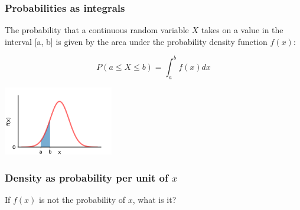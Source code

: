 \documentclass[9pt]{beamer}
\begin{document}
\begin{frame}
\frametitle{Probabilities as integrals}

The probability that a continuous random variable $X$ takes on a value in the interval [a, b] is given by the area under the probability density function $f(x)$:

\vspace{-0cm}

\begin{equation*}
P(a \leq X \leq b) = \int_a^b f(x) dx
\end{equation*}

\vspace{-0.2cm}
\begin{center}
\includegraphics[height=3cm]{images/normal_area.png}
\end{center}

\end{frame}

\begin{frame}
\frametitle{Density as probability per unit of $x$}

If $f(x)$ is not the probability of $x$, what is it?

\


\vspace{-0.8cm}


\end{frame}
\end{document}

